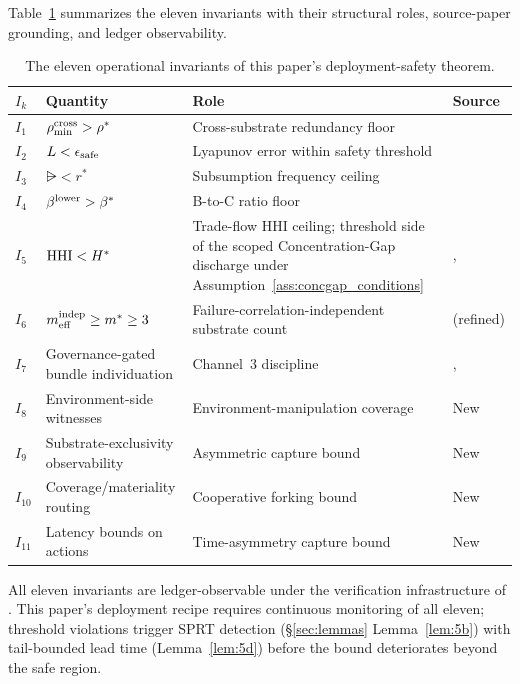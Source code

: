 Table~\ref{tab:invariants} summarizes the eleven invariants with
their structural roles, source-paper grounding, and ledger
observability.

\begin{table}[h]
\centering
\footnotesize
\caption{The eleven operational invariants of this paper's deployment-safety theorem.}
\label{tab:invariants}
\renewcommand{\arraystretch}{1.15}
\begin{tabular}{@{}p{} p{} p{} p{}@{}}
\toprule
\textbf{$I_k$} & \textbf{Quantity} & \textbf{Role} & \textbf{Source} \\
\midrule
$I_1$ & $\rho_{\min}^{\mathrm{cross}} > \rho^*$ & Cross-substrate redundancy floor & \citep[Phase Redundancy]{lasser2026phase} \\
$I_2$ & $L < \epsilon_{\mathrm{safe}}$ & Lyapunov error within safety threshold & \citep[Phase Redundancy]{lasser2026phase} \\
$I_3$ & $\rsub < r^*$ & Subsumption frequency ceiling & \citep[Phase Redundancy]{lasser2026phase} \\
$I_4$ & $\beta^{\mathrm{lower}} > \beta^*$ & B-to-C ratio floor & \citep[Revealed Sacrifice]{lasser2026paper8a} \\
$I_5$ & $\mathrm{HHI} < H^*$ & Trade-flow HHI ceiling; threshold side of the scoped Concentration-Gap discharge under Assumption~\ref{ass:concgap_conditions} & \citep[Need Sufficiency]{lasser2026paper8b}, \citep[Theorem~2]{lasser2026foundations} \\
$I_6$ & $m_{\mathrm{eff}}^{\mathrm{indep}} \geq m^* \geq 3$ & Failure-correlation-independent substrate count & \citep[Phase Redundancy]{lasser2026phase} (refined) \\
$I_7$ & Governance-gated bundle individuation & Channel~3 discipline & \citep[Exogenous Verification]{lasser2026exo}, \citep[Microfoundation]{lasser2026micro} \\
$I_8$ & Environment-side witnesses & Environment-manipulation coverage & New \\
$I_9$ & Substrate-exclusivity observability & Asymmetric capture bound & New \\
$I_{10}$ & Coverage/materiality routing & Cooperative forking bound & New \\
$I_{11}$ & Latency bounds on actions & Time-asymmetry capture bound & New \\
\bottomrule
\end{tabular}
\end{table}

All eleven invariants are ledger-observable under the verification
infrastructure of \citep{lasser2026exo}. This paper's deployment
recipe requires continuous monitoring of all eleven; threshold
violations trigger SPRT detection
(\S\ref{sec:lemmas} Lemma~\ref{lem:5b}) with tail-bounded lead
time (Lemma~\ref{lem:5d}) before the bound deteriorates beyond
the safe region.

